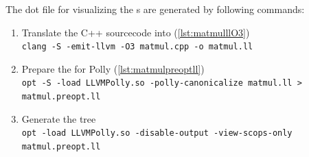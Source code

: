 The dot file for visualizing the \scop s are generated by following commands:
\begin{enumerate}
    \item Translate the C++ sourcecode into \llvmir (\autoref{lst:matmulllO3})\\
        \texttt{clang -S -emit-llvm -O3 matmul.cpp -o matmul.ll}
    \item Prepare the \llvmir for Polly (\autoref{lst:matmulpreoptll})\\
        \texttt{opt -S -load LLVMPolly.so -polly-canonicalize matmul.ll > matmul.preopt.ll}
    \item Generate the \scop tree\\
        \texttt{opt -load LLVMPolly.so -disable-output -view-scops-only matmul.preopt.ll}
\end{enumerate}
